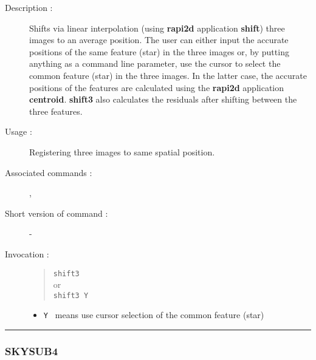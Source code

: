 \begin{description}

\item[Description :] Shifts via linear interpolation (using {\bf
rapi2d} application {\bf shift}) three images to an average position.
The user can either input the accurate positions of the same feature
(star) in the three images or, by putting anything as a command line
parameter, use the cursor to select the common feature (star) in the
three images. In the latter case, the accurate positions of the
features are calculated using the {\bf rapi2d} application {\bf
centroid}.  {\bf shift3} also calculates the residuals after shifting
between the three features.

\item[Usage :] Registering three images to same spatial position.

\item[Associated commands :] {\tt {}}, 
{\tt {}}

\item[Short version of command :] -
\item[Invocation :]

\begin{quote}{\tt  shift3 }\\
or \\
{\tt shift3 Y }
\end{quote}

\begin{itemize}

\item {\tt Y }  means use cursor selection of the common feature (star)
\end{itemize}

\end{description}

\hrule 
\subsubsection*{\label{SKYSUB4}SKYSUB4}

